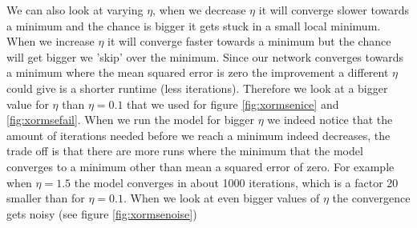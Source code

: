 \documentclass[10 pt, a4paper]{article}
\begin{document}
We can also look at varying $\eta$, when we decrease $\eta$ it will converge slower towards a minimum and the chance is bigger it gets stuck in a small local minimum. When we increase $\eta$ it will converge faster towards a minimum but the chance will get bigger we 'skip' over the minimum. Since our network converges towards a minimum where the mean squared error is zero the improvement a different $\eta$ could give is a shorter runtime (less iterations). Therefore we look at a bigger value for $\eta$ than $\eta = 0.1$ that we used for figure \ref{fig:xormsenice} and \ref{fig:xormsefail}. When we run the model for bigger $\eta$ we indeed notice that the amount of iterations needed before we reach a minimum indeed decreases, the trade off is that there are more runs where the minimum that the model converges to a minimum other than mean a squared error of zero. For example when $\eta = 1.5$ the model converges in about 1000 iterations, which is a factor 20 smaller than for $\eta = 0.1$. When we look at even bigger values of $\eta$ the convergence gets noisy (see figure \ref{fig:xormsenoise})
\end{document}

